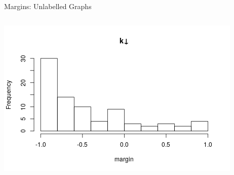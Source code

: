 \documentclass{beamer}
\begin{document}
\begin{frame}{Margins: Unlabelled Graphs}
\begin{columns}[t]
\begin{column}{0.5\textwidth}
      \includegraphics[width=\textwidth,height=0.4\textheight,keepaspectratio]{../dissertation/images/kdown_hist.png}
    \end{column}
  \end{columns}
\end{frame}
\end{document}
